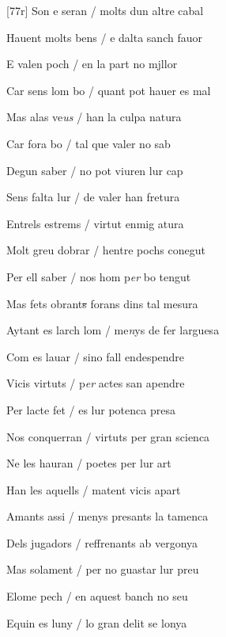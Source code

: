 \documentclass[12pt]{article}
\begin{document}
\begin{estrofa}

 [77r] Son e seran / molts dun altre cabal

 Hauent molts bens / e dalta sanch fauor

 E valen poch / en la part no mjllor

 Car sens lom bo / quant pot hauer es mal

 Mas alas ve\textit{us} / han la culpa natura

 Car fora bo / tal que valer no sab

 Degun saber / no pot viuren lur cap

 Sens falta lur / de valer han fretura

\end{estrofa}



\begin{estrofa}

 Entrels estrems / virtut enmig atura

 Molt greu dobrar / hentre pochs conegut

 Per ell saber / nos hom p\textit{er} bo tengut

 Mas fets obrant\sout{s} forans dins tal mesura

 Aytant es larch lom / me\textit{n}ys de fer larguesa

 Com es lauar / sino fall endespendre

 Vicis virtuts / p\textit{er }actes san apendre

 Per lacte fet / es lur potenca presa

\end{estrofa}



\begin{estrofa}

 Nos conquerran / virtuts per gran scienca

 Ne les hauran / poetes per lur art

 Han les aquells / matent vicis apart

 Amants assi / menys presants la tamenca

 Dels jugadors / reffrenants ab vergonya

 Mas solament / per no guastar lur preu

 Elome pech / en aquest banch no seu

 Equin es luny / lo gran delit se lonya

\end{estrofa}
\end{document}
